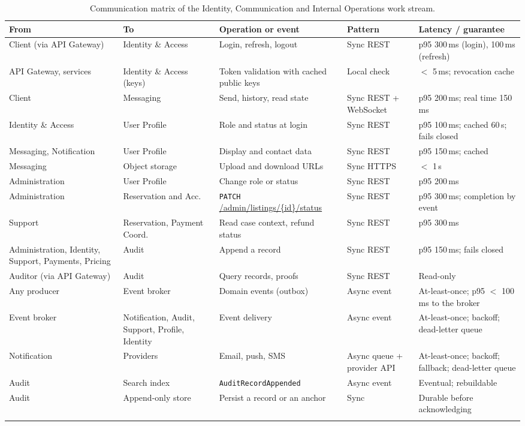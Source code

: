 \begin{longtable}{@{}L{2.3cm}L{2.3cm}L{4.0cm}L{1.6cm}L{2.5cm}@{}}
\toprule
\textbf{From} & \textbf{To} & \textbf{Operation or event} & \textbf{Pattern} & \textbf{Latency / guarantee} \\
\midrule
\endhead
Client (via API Gateway) & Identity \& Access & Login, refresh, logout & Sync REST & p95 300\,ms (login), 100\,ms (refresh) \\
API Gateway, services & Identity \& Access (keys) & Token validation with cached public keys & Local check & $<$ 5\,ms; revocation cache \\
Client & Messaging & Send, history, read state & Sync REST + WebSocket & p95 200\,ms; real time 150\,ms \\
Identity \& Access & User Profile & Role and status at login & Sync REST & p95 100\,ms; cached 60\,s; fails closed \\
Messaging, Notification & User Profile & Display and contact data & Sync REST & p95 150\,ms; cached \\
Messaging & Object storage & Upload and download URLs & Sync HTTPS & $<$ 1\,s \\
Admin\-istration & User Profile & Change role or status & Sync REST & p95 200\,ms \\
Admin\-istration & Reservation and Acc. & \texttt{PATCH} \url{/admin/listings/{id}/status} & Sync REST & p95 300\,ms; completion by event \\
Support & Reservation, Payment Coord. & Read case context, refund status & Sync REST & p95 300\,ms \\
Admin\-istration, Identity, Support, Payments, Pricing & Audit & Append a record & Sync REST & p95 150\,ms; fails closed \\
Auditor (via API Gateway) & Audit & Query records, proofs & Sync REST & Read-only \\
Any producer & Event broker & Domain events (outbox) & Async event & At-least-once; p95 $<$ 100\,ms to the broker \\
Event broker & Notification, Audit, Support, Profile, Identity & Event delivery & Async event & At-least-once; backoff; dead-letter queue \\
Notification & Providers & Email, push, SMS & Async queue + provider API & At-least-once; backoff; fallback; dead-letter queue \\
Audit & Search index & \texttt{Audit\allowbreak Record\allowbreak Appended} & Async event & Eventual; rebuildable \\
Audit & Append-only store & Persist a record or an anchor & Sync & Durable before acknowledging \\
\bottomrule
\caption{Communication matrix of the Identity, Communication and Internal
Operations work stream.}
\label{tab:id-matrix}
\end{longtable}
\endgroup


